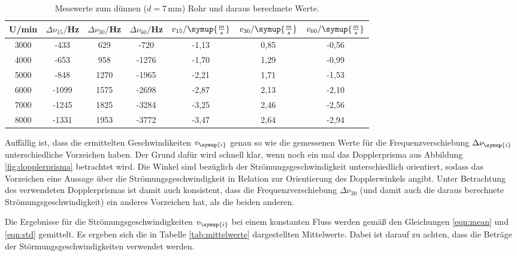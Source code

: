 \begin{table}[htp]
	\begin{center}
    \caption{Messwerte zum dünnen ($d=7\,$mm) Rohr und daraus berechnete Werte.}
    \label{tab:dünn}
		\begin{tabular}{ccccccc}
		\toprule
			{U/min} & {$\Delta \nu_{15}/$Hz} & {$\Delta \nu_{30}/$Hz} & {$\Delta \nu_{60}/$Hz} &
      {$v_{15}/\symup{\frac{m}{s}}$} & {$v_{30}/\symup{\frac{m}{s}}$} & {$v_{60}/\symup{\frac{m}{s}}$}\\
			\midrule
			3000 & -433 & 629 & -720 & -1,13 & 0,85 & -0,56\\
			4000 & -653 & 958 & -1276 & -1,70 & 1,29 & -0,99\\
			5000 & -848 & 1270 & -1965 & -2,21 & 1,71 & -1,53\\
			6000 & -1099 & 1575 & -2698 & -2,87 & 2,13 & -2,10\\
			7000 & -1245 & 1825 & -3284 & -3,25 & 2,46 & -2,56\\
			8000 & -1331 & 1953 & -3772 & -3,47 & 2,64 & -2,94\\
		\bottomrule
		\end{tabular}
	\end{center}
\end{table}
Auffällig ist, dass die ermittelten Geschwindikeiten $v_{\symup{i}}$ genau so wie die gemessenen
Werte für die Frequenzverschiebung $\Delta \nu_{\symup{i}}$ unterschiedliche Vorzeichen haben.
Der Grund dafür wird schnell klar, wenn noch ein mal das Dopplerprisma aus Abbildung
\ref{fig:dopplerprisma} betrachtet wird. Die Winkel sind bezüglich der Strömungsgeschwindigkeit
unterschiedlich orientiert, sodass das Vorzeichen eine Aussage über die Strömungsgeschwindigkeit
in Relation zur Orientierung des Dopplerwinkels angibt. Unter Betrachtung des verwendeten
Dopplerprismas ist damit auch konsistent, dass die Frequenzverschiebung $\Delta \nu_{30}$
(und damit auch die daraus berechnete Strömungsgeschwindigkeit) ein anderes Vorzeichen hat,
als die beiden anderen.

Die Ergebnisse für die Strömungsgeschwindigkeiten $v_{\symup{i}}$ bei einem
konstanten Fluss werden gemäß den Gleichungen \eqref{eqn:mean} und \eqref{eqn:std}
gemittelt. Es ergeben sich die in Tabelle \ref{tab:mittelwerte} dargestellten Mittelwerte.
Dabei ist darauf zu achten, dass die Beträge der Störmungsgeschwindigkeiten verwendet werden.


